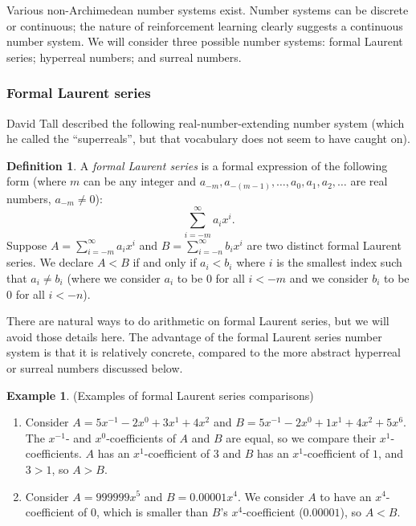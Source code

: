 \documentclass[reqno]{article}
\theoremstyle{definition}
\newtheorem{example}[theorem]{Example}
\newtheorem{definition}{Definition}
\begin{document}
Various non-Archimedean number systems exist. Number systems can be
discrete or continuous; the nature of reinforcement learning clearly
suggests a continuous number system. We will consider three possible
number systems: formal Laurent series; hyperreal numbers; and
surreal numbers.

\subsubsection{Formal Laurent series}

David Tall described \cite{tall1980looking} the following
real-number-extending number system (which he called the ``superreals'', but
that vocabulary does not seem to have caught on).

\begin{definition}
A \emph{formal Laurent series} is a formal expression of the following form
(where $m$ can be any integer and $a_{-m},a_{-(m-1)},\ldots,a_0,a_1,a_2,\ldots$
are real numbers, $a_{-m}\not=0$):
\[
\sum_{i=-m}^\infty a_i x^i.
\]
Suppose $A=\sum_{i=-m}^\infty a_ix^i$
and $B=\sum_{i=-n}^\infty b_ix^i$ are two distinct formal Laurent series.
We declare $A<B$ if and only if $a_i<b_i$ where $i$ is the smallest
index such that $a_i\not=b_i$ (where we consider $a_i$ to be $0$ for all
$i<-m$ and we consider $b_i$ to be $0$ for all $i<-n$).
\end{definition}

There are natural ways to do arithmetic on formal Laurent series, but we will
avoid those details here.
The advantage of the formal Laurent series number system is that it is
relatively concrete, compared to the more abstract hyperreal or surreal numbers
discussed below.

\begin{example}
(Examples of formal Laurent series comparisons)
\begin{enumerate}
    \item Consider $A=5x^{-1}-2x^{0}+3x^1+4x^2$ and
    $B=5x^{-1}-2x^0+1x^1+4x^2+5x^6$.
    The $x^{-1}$- and $x^0$-coefficients of $A$ and $B$ are equal, so
    we compare their $x^1$-coefficients. $A$ has an $x^1$-coefficient of $3$ and
    $B$ has an $x^1$-coefficient of $1$, and $3>1$, so $A>B$.
    \item Consider $A=999999x^5$ and $B=0.00001x^{4}$.
    We consider $A$ to have an $x^{4}$-coefficient of $0$, which is smaller than
    $B$'s $x^{4}$-coefficient ($0.00001$), so $A<B$.
\end{enumerate}
\end{example}
\end{document}
